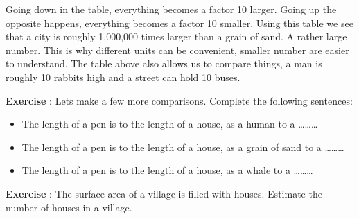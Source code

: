 \documentclass[12pt,a4paper]{article}
\numberwithin{equation}{section}
\numberwithin{figure}{section}
\newcounter{Exercise}
\numberwithin{table}{section}
\begin{document}
Going down in the table, everything becomes a factor 10 larger. Going up the opposite happens, everything becomes a factor 10 smaller. Using this table we see that a city is roughly 1,000,000 times larger than a grain of sand. A rather large number. This is why different units can be convenient, smaller number are easier to understand. The table above also allows us to compare things, a man is roughly 10 rabbits high and a street can hold 10 buses.

\begin{shaded}
\textbf{Exercise \theExercise {}} : Lets make a few more comparisons. Complete the following sentences:
\begin{itemize}
\item The length of a pen is to the length of a house, as a human to a \ldots \ldots \ldots
\item The length of a pen is to the length of a house, as a grain of sand to a \ldots \ldots \ldots
\item The length of a pen is to the length of a house, as a whale to a \ldots \ldots \ldots
\end{itemize}\end{shaded}
\begin{shaded}
\textbf{Exercise \theExercise {}} : The surface area of a village is filled with houses. Estimate the number of houses in a village.\end{shaded}
\end{document}
